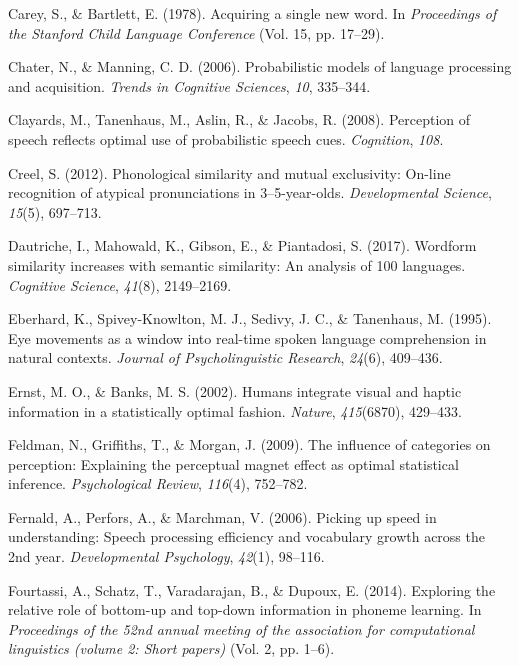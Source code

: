 \documentclass[english,floatsintext,man]{apa6}
\theoremstyle{definition}
\theoremstyle{definition}
\theoremstyle{definition}
\theoremstyle{remark}
\begin{document}
\hypertarget{ref-carey1978b}{}
Carey, S., \& Bartlett, E. (1978). Acquiring a single new word. In
\emph{Proceedings of the Stanford Child Language Conference} (Vol. 15,
pp. 17--29).

\hypertarget{ref-chater06}{}
Chater, N., \& Manning, C. D. (2006). Probabilistic models of language
processing and acquisition. \emph{Trends in Cognitive Sciences},
\emph{10}, 335--344.

\hypertarget{ref-clayard08}{}
Clayards, M., Tanenhaus, M., Aslin, R., \& Jacobs, R. (2008). Perception
of speech reflects optimal use of probabilistic speech cues.
\emph{Cognition}, \emph{108}.

\hypertarget{ref-Creel2012}{}
Creel, S. (2012). Phonological similarity and mutual exclusivity:
On-line recognition of atypical pronunciations in 3--5-year-olds.
\emph{Developmental Science}, \emph{15}(5), 697--713.

\hypertarget{ref-dautriche17}{}
Dautriche, I., Mahowald, K., Gibson, E., \& Piantadosi, S. (2017).
Wordform similarity increases with semantic similarity: An analysis of
100 languages. \emph{Cognitive Science}, \emph{41}(8), 2149--2169.

\hypertarget{ref-Eberhard1995}{}
Eberhard, K., Spivey-Knowlton, M. J., Sedivy, J. C., \& Tanenhaus, M.
(1995). Eye movements as a window into real-time spoken language
comprehension in natural contexts. \emph{Journal of Psycholinguistic
Research}, \emph{24}(6), 409--436.

\hypertarget{ref-ernst02}{}
Ernst, M. O., \& Banks, M. S. (2002). Humans integrate visual and haptic
information in a statistically optimal fashion. \emph{Nature},
\emph{415}(6870), 429--433.

\hypertarget{ref-feldman2009}{}
Feldman, N., Griffiths, T., \& Morgan, J. (2009). The influence of
categories on perception: Explaining the perceptual magnet effect as
optimal statistical inference. \emph{Psychological Review},
\emph{116}(4), 752--782.

\hypertarget{ref-fernald2006}{}
Fernald, A., Perfors, A., \& Marchman, V. (2006). Picking up speed in
understanding: Speech processing efficiency and vocabulary growth across
the 2nd year. \emph{Developmental Psychology}, \emph{42}(1), 98--116.

\hypertarget{ref-fourtassi2014b}{}
Fourtassi, A., Schatz, T., Varadarajan, B., \& Dupoux, E. (2014).
Exploring the relative role of bottom-up and top-down information in
phoneme learning. In \emph{Proceedings of the 52nd annual meeting of the
association for computational linguistics (volume 2: Short papers)}
(Vol. 2, pp. 1--6).
\end{document}
